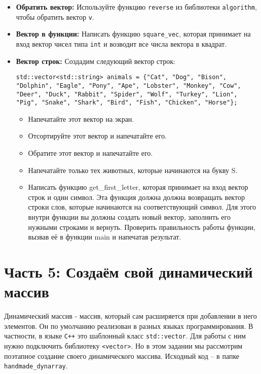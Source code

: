 \documentclass{article}
\begin{document}
\begin{itemize}
\item \textbf{Обратить вектор:} Используйте функцию \texttt{reverse} из библиотеки \texttt{algorithm}, чтобы обратить вектор \texttt{v}.
\item \textbf{Вектор в функции:} Написать функцию \texttt{square\_vec}, которая принимает на вход вектор чисел типа \texttt{int} и возводит все числа вектора в квадрат.

\item \textbf{Вектор строк:} Создадим следующий вектор строк:
\begin{lstlisting}
std::vector<std::string> animals = {"Cat", "Dog", "Bison", "Dolphin", "Eagle", "Pony", "Ape", "Lobster", "Monkey", "Cow", "Deer", "Duck", "Rabbit", "Spider", "Wolf", "Turkey", "Lion", "Pig", "Snake", "Shark", "Bird", "Fish", "Chicken", "Horse"};
\end{lstlisting}
\begin{itemize}
\item Напечатайте этот вектор на экран.
\item Отсортируйте этот вектор и напечатайте его.
\item Обратите этот вектор и напечатайте его.
\item Напечатайте только тех животных, которые начинаются на букву S.
\item Написать функцию get\_first\_letter, которая принимает на вход вектор строк и один символ. Эта функция должна должна возвращать вектор строки слов, которые начинаются на соответствующий символ. Для этого внутри функции вы должны создать новый вектор, заполнить его нужными строками и вернуть. Проверить правильность работы функции, вызвав её в функции main и напечатав результат.
\end{itemize}
\end{itemize}
\fi


\newpage
\section*{Часть 5: Создаём свой динамический массив}

Динамический массив - массив, который сам расширяется при добавлении в него элементов. Он по умолчанию реализован в разных языках программирования. В частности, в языке \texttt{C++} это шаблонный класс \texttt{std::vector}. Для работы с ним нужно подключить библиотеку \texttt{<vector>}. Но в этом задании мы рассмотрим поэтапное создание своего динамического массива. Исходный код -- в папке \texttt{handmade\_dynarray}.
\end{document}
